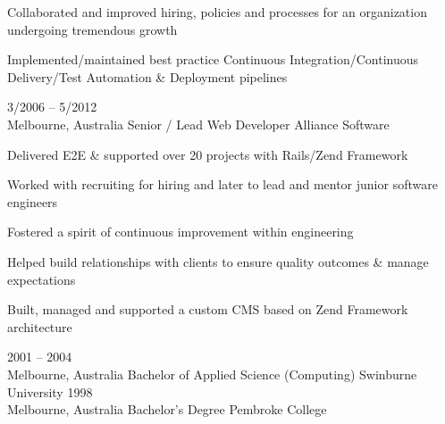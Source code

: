 \documentclass[9pt]{developercv} %
\begin{document}
\begin{entrylist}
{    \par\medskip Collaborated and improved hiring, policies and processes for an organization undergoing tremendous growth
    \par\medskip Implemented/maintained best practice Continuous
    Integration/Continuous Delivery/Test Automation \& Deployment pipelines}
	\entry
		{3/2006 -- 5/2012\\\footnotesize{Melbourne, Australia}}
		{Senior / Lead Web Developer}
		{Alliance Software}
    {Delivered E2E \& supported over 20 projects with Rails/Zend Framework
    \par\medskip Worked with recruiting for hiring and later to lead and mentor junior software engineers
    \par\medskip Fostered a spirit of continuous improvement within engineering
    \par\medskip Helped build relationships with clients to ensure quality outcomes \& manage expectations
    \par\medskip Built, managed and supported a custom CMS based on Zend
    Framework architecture}

\end{entrylist}



\begin{entrylist}
	\entry
    {2001 -- 2004\\\footnotesize{Melbourne, Australia}}
    {Bachelor of Applied Science (Computing)}
    {Swinburne University}
		{}
	\entry
    {1998\\\footnotesize{Melbourne, Australia}}
		{Bachelor's Degree}
    {Pembroke College}
		{}
\end{entrylist}




\end{document}
